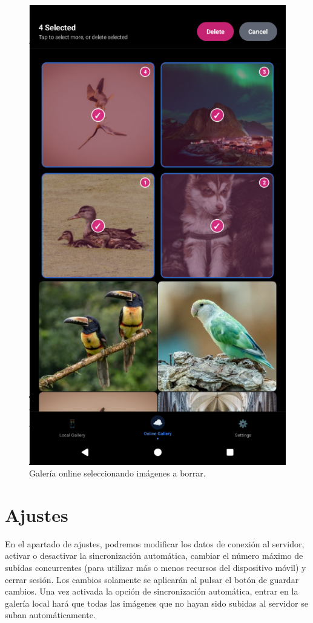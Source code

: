 \begin{figure}[H]
\begin{minipage}[t]{0.3\textwidth}
    \includegraphics[width=\textwidth]{assets/online-gallery-mobile-2.png}
    \caption{Galería online seleccionando imágenes a borrar.}
    \label{fig:online-gallery-mobile1}
  \end{minipage}
\end{figure}

\section{Ajustes}
En el apartado de ajustes, podremos modificar los datos de conexión al servidor, activar o desactivar la sincronización automática, cambiar el número máximo de subidas concurrentes (para utilizar más o menos recursos del dispositivo móvil) y cerrar sesión. Los cambios solamente se aplicarán al pulsar el botón de guardar cambios. Una vez activada la opción de sincronización automática, entrar en la galería local hará que todas las imágenes que no hayan sido subidas al servidor se suban automáticamente.

